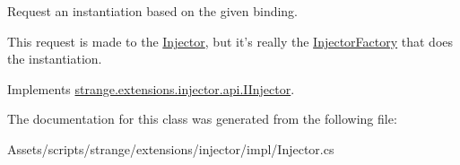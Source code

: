 Request an instantiation based on the given binding. 

This request is made to the \hyperlink{classstrange_1_1extensions_1_1injector_1_1impl_1_1_injector}{Injector}, but it's really the \hyperlink{classstrange_1_1extensions_1_1injector_1_1impl_1_1_injector_factory}{Injector\-Factory} that does the instantiation. 

Implements \hyperlink{interfacestrange_1_1extensions_1_1injector_1_1api_1_1_i_injector_ab6c185a183b27708e38c4954195fe591}{strange.\-extensions.\-injector.\-api.\-I\-Injector}.



The documentation for this class was generated from the following file\-:\begin{DoxyCompactItemize}
\item 
Assets/scripts/strange/extensions/injector/impl/Injector.\-cs\end{DoxyCompactItemize}
